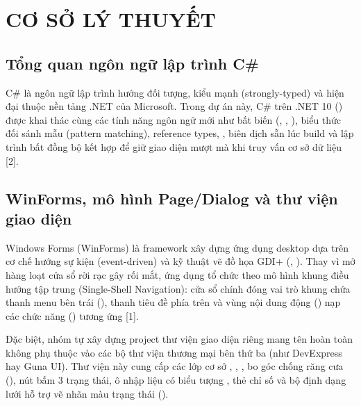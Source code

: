 \chapter{CƠ SỞ LÝ THUYẾT}

\section{Tổng quan ngôn ngữ lập trình C\#}

C\# là ngôn ngữ lập trình hướng đối tượng, kiểu mạnh (strongly-typed) và hiện đại thuộc nền tảng .NET của Microsoft. Trong dự án này, C\# trên .NET 10 () được khai thác cùng các tính năng ngôn ngữ mới như  bất biến (, , ), biểu thức  đối sánh mẫu (pattern matching),  reference types, ,  biên dịch sẵn lúc build và lập trình bất đồng bộ  kết hợp  để giữ giao diện mượt mà khi truy vấn cơ sở dữ liệu [2].


\section{WinForms, mô hình Page/Dialog và thư viện giao diện}

Windows Forms (WinForms) là framework xây dựng ứng dụng desktop dựa trên cơ chế hướng sự kiện (event-driven) và kỹ thuật vẽ đồ họa GDI+ (, ). Thay vì mở hàng loạt cửa sổ rời rạc gây rối mắt, ứng dụng  tổ chức theo mô hình khung điều hướng tập trung (Single-Shell Navigation): cửa sổ chính  đóng vai trò khung chứa thanh menu bên trái (), thanh tiêu đề phía trên và vùng nội dung động () nạp các  chức năng () tương ứng [1].


Đặc biệt, nhóm tự xây dựng project thư viện giao diện riêng mang tên  hoàn toàn không phụ thuộc vào các bộ thư viện thương mại bên thứ ba (như DevExpress hay Guna UI). Thư viện này cung cấp các lớp cơ sở , , ,  bo góc chống răng cưa (), nút bấm  3 trạng thái, ô nhập liệu  có biểu tượng , thẻ chỉ số  và bộ định dạng lưới  hỗ trợ vẽ nhãn màu trạng thái ().


